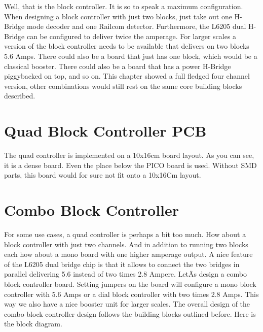 Well, that is the block controller. It is so to speak a maximum configuration. When designing a block controller with just two blocks, just take out one H-Bridge mode decoder and one Railcom detector. Furthermore, the L6205 dual H-Bridge can be configured to deliver twice the amperage. For larger scales a version of the block controller needs to be available that delivers on two blocks 5.6 Amps. There could also be a board that just has one block, which would be a classical booster. There could also be a board that has a power H-Bridge piggybacked on top, and so on. This chapter showed a full fledged four channel version, other combinations would still rest on the same core building blocks described.

\section{Quad Block Controller PCB}

The quad controller is implemented on a 10x16cm board layout. As you can see, it is a dense board. Even the place below the PICO board is used. Without SMD parts, this board would for sure not fit onto a 10x16Cm layout.


\section{Combo Block Controller}

For some use cases, a quad controller is perhaps a bit too much. How about a block controller with just two channels. And in addition to running two blocks each how about a mono board with one higher amperage output. A nice feature of the L6205 dual bridge chip is that it allows to connect the two bridges in parallel delivering 5.6 instead of two times 2.8 Ampere. LetÄs design a combo block controller board. Setting jumpers on the board will configure a mono block controller with 5.6 Amps or a dial block controller with two times 2.8 Amps. This way we also have a nice booster unit for larger scales. The overall design of the combo block controller design follows the building blocks outlined before. Here is the block diagram.

